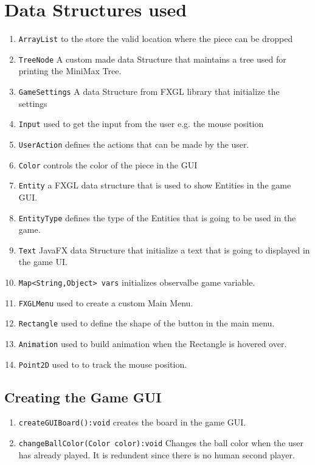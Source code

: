 \documentclass{article}
\begin{document}
\section{Data Structures used}
\begin{enumerate}
    \item \verb!ArrayList! to the store the valid location where the piece can be dropped
    \item \verb"TreeNode" A custom made data Structure that maintains a tree used for printing the MiniMax Tree.
    \item \verb"GameSettings" A data Structure from FXGL library that initialize the settings
    \item \verb"Input" used to get the input from the user e.g. the mouse position
    \item \verb"UserAction" defines the actions that can be made by the user.
    \item \verb"Color" controls the color of the piece in the GUI
    \item \verb"Entity" a FXGL data structure that is used to show Entities in the game GUI.
    \item \verb"EntityType" defines the type of the Entities that is going to be used in the game.
    \item \verb"Text" JavaFX data Structure that initialize a text that is going to displayed in the game UI.
    \item \verb"Map<String,Object> vars" initializes observalbe game variable.
    \item \verb"FXGLMenu" used to create a custom Main Menu.
    \item \verb"Rectangle" used to define the shape of the button in the main menu.
    \item \verb"Animation" used to build animation when the Rectangle is hovered over.
    \item \verb"Point2D" used to to track the mouse position.
\end{enumerate}
\subsection{Creating the Game GUI}
\begin{enumerate}
    \item \verb"createGUIBoard():void" creates the board in the game GUI.
    \item \verb"changeBallColor(Color color):void" Changes the ball color when the user has already played. It is redundent since there is no human second player.
\end{enumerate}
\end{document}

